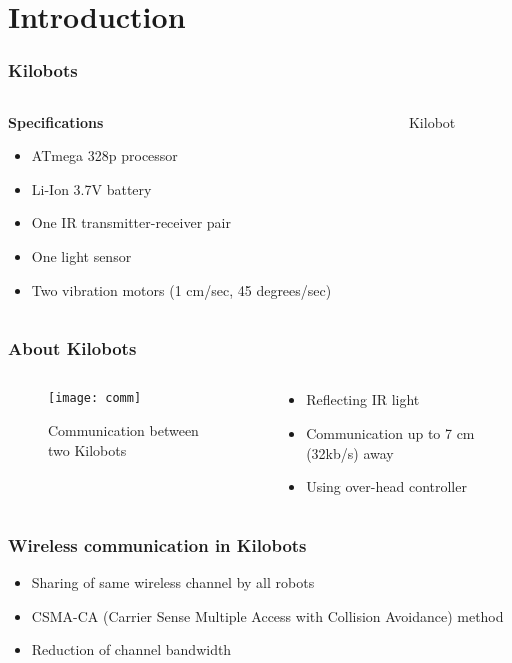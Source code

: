 \section{Introduction}
\begin{frame}
	\frametitle{Kilobots}
	\begin{columns}
		\begin{column}{0.5\textwidth}
			\textbf{Specifications}
			\vspace{0.2cm}
			\begin{itemize}
				\item ATmega 328p processor 
				\item Li-Ion 3.7V battery 
				\item One IR transmitter-receiver pair 
				\item One light sensor 
				\item Two vibration motors (1 cm/sec, 45 degrees/sec)
			\end{itemize}
		\end{column}
	\begin{column}{0.5\textwidth}
		\begin{figure}
			\centering
			\hspace{5cm}
			\caption{Kilobot}
		\end{figure}
	\end{column}
	\end{columns}
\end{frame}

\begin{frame}
	\frametitle{About Kilobots}
	\begin{columns}
		\begin{column}{0.4\textwidth}
			\begin{figure}
				\centering
				\texttt{[image: comm]}
				\caption{Communication between two Kilobots}
			\end{figure}
		\end{column}
		\begin{column}{0.5\textwidth}
			\begin{itemize}
				\item Reflecting IR light
				\item Communication up to 7 cm (32kb/s) away 
				\item Using over-head controller
			\end{itemize}
		\end{column}
	\end{columns}
\end{frame}

\begin{frame}
	\frametitle{Wireless communication in Kilobots}
	\begin{itemize}
		\item Sharing of same wireless channel by all robots
		\item CSMA-CA (Carrier Sense Multiple Access with Collision Avoidance) method 
		\item Reduction of channel bandwidth        
	\end{itemize}
\end{frame}
